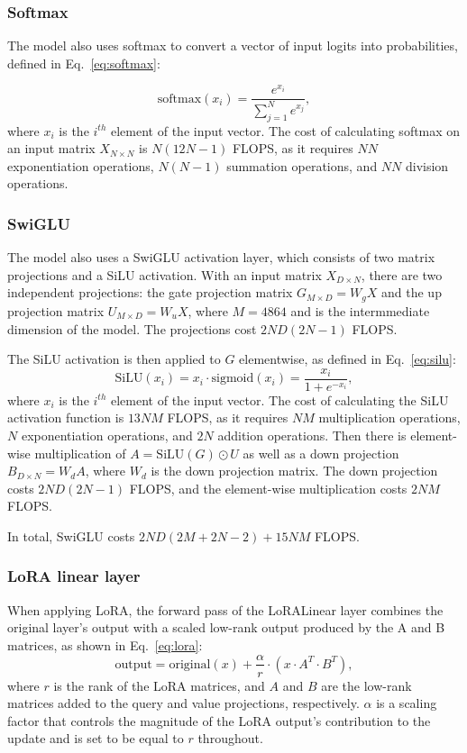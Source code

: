 \documentclass[11pt,a4paper]{article}
\begin{document}
\subsubsection{Softmax}
The model also uses softmax to convert a vector of input logits into probabilities, defined in Eq.~\ref{eq:softmax}:

\begin{equation}
    \mathrm{softmax}(x_i) = \frac{e^{x_i}}{\sum^N_{j=1} e^{x_j}},
    \label{eq:softmax}
\end{equation}
where $x_i$ is the $i^{th}$ element of the input vector. The cost of calculating softmax on an input matrix $X_{N \times N}$ is $N(12N - 1)$ FLOPS, as it requires $NN$ exponentiation operations, $N(N-1)$ summation operations, and $NN$ division operations.

\subsubsection{SwiGLU}
The model also uses a SwiGLU activation layer, which consists of two matrix projections and a SiLU activation. With an input matrix $X_{D \times N}$, there are two independent projections: the gate projection matrix $G_{M \times D}=W_g X$ and the up projection matrix $U_{M \times D}=W_u X$, where $M=4864$ and is the intermmediate dimension of the model. The projections cost $2ND(2N-1)$ FLOPS.

The SiLU activation is then applied to $G$ elementwise, as defined in Eq.~\ref{eq:silu}:
\begin{equation}
    \mathrm{SiLU}(x_i) = x_i \cdot \mathrm{sigmoid}(x_i) = \frac{x_i}{1 + e^{-x_i}},
    \label{eq:silu}
\end{equation}
where $x_i$ is the $i^{th}$ element of the input vector. The cost of calculating the SiLU activation function is $13NM$ FLOPS, as it requires $NM$ multiplication operations, $N$ exponentiation operations, and $2N$ addition operations. Then there is element-wise multiplication of $A = \mathrm{SiLU}(G) \odot U$ as well as a down projection $B_{D \times N} = W_d A$, where $W_d$ is the down projection matrix. The down projection costs $2ND(2N-1)$ FLOPS, and the element-wise multiplication costs $2NM$ FLOPS.

In total, SwiGLU costs $2ND(2M + 2N -2) + 15NM$ FLOPS.

\subsubsection{LoRA linear layer}
When applying LoRA, the forward pass of the LoRALinear layer combines the original layer's output with a scaled low-rank output produced by the A and B matrices, as shown in Eq.~\ref{eq:lora}:
\begin{equation}
    \mathrm{output} = \mathrm{original}(x) + \frac{\alpha}{r} \cdot (x \cdot A^T \cdot B^T),
    \label{eq:lora}
\end{equation}
where $r$ is the rank of the LoRA matrices, and $A$ and $B$ are the low-rank matrices added to the query and value projections, respectively. $\alpha$ is a scaling factor that controls the magnitude of the LoRA output's contribution to the update and is set to be equal to $r$ throughout.
\end{document}
